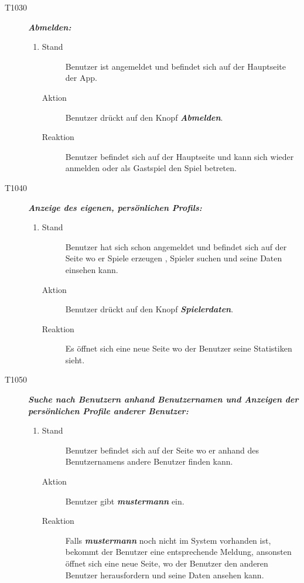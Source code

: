 \documentclass[parskip=full]{scrartcl}
\begin{document}
\begin{description}
\begin{enumerate}
	\end{enumerate}
	\item[T1030] \textbf{\textit{Abmelden: }} 
	\begin{enumerate}
		\item 
		\begin{description}
			\item[Stand] Benutzer ist angemeldet und befindet sich auf der Hauptseite der App.
			\item[Aktion] Benutzer drückt auf den Knopf \textbf{\textit{Abmelden}}.
			\item[Reaktion] Benutzer befindet sich auf der Hauptseite und kann sich wieder anmelden oder als Gastspiel den Spiel betreten.
		\end{description}
	\end{enumerate}
	
	\item[T1040] \textbf{\textit{Anzeige des eigenen, persönlichen Profils: }} 
	\begin{enumerate}
		\item 
		\begin{description}
			\item[Stand] Benutzer hat sich schon angemeldet und befindet sich auf der Seite wo er Spiele erzeugen , Spieler suchen und seine Daten einsehen kann.
			\item[Aktion] Benutzer drückt auf den Knopf \textbf{\textit{Spielerdaten}}.
			\item[Reaktion] Es öffnet sich eine neue Seite wo der Benutzer seine Statistiken sieht.
		\end{description}
	\end{enumerate}
	
	\item[T1050] \textbf{\textit{Suche nach Benutzern anhand Benutzernamen und Anzeigen der persönlichen Profile anderer Benutzer: }} 
	\begin{enumerate}
		\item 
		\begin{description}
			\item[Stand] Benutzer befindet sich auf der Seite wo er anhand des Benutzernamens andere Benutzer finden kann.
			\item[Aktion] Benutzer gibt \textbf{\textit{mustermann }}ein.
			\item[Reaktion] Falls \textbf{\textit{mustermann }}noch nicht im System vorhanden ist, bekommt der Benutzer eine entsprechende Meldung, ansonsten öffnet sich eine neue Seite, wo der Benutzer den anderen Benutzer herausfordern und seine Daten ansehen kann.
		\end{description}
	\end{enumerate}
	

\end{description}
\end{document}
